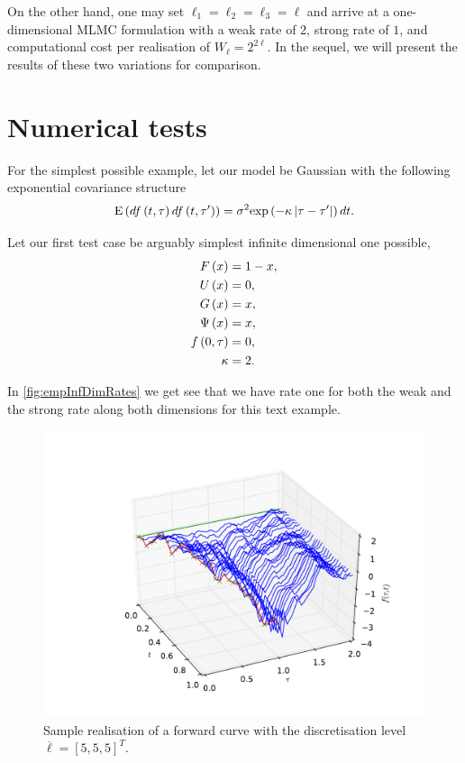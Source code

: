 \documentclass[11pt]{amsart}
\begin{document}
On the other hand, one may set $\ell_1=\ell_2=\ell_3=\ell$
and arrive at a one-dimensional MLMC formulation with a weak rate of $2$, strong rate of $1$, and computational cost per realisation of $W_\ell=2^{2\ell}$. In the sequel, we will present the results of these two variations for comparison.

\section{Numerical tests}

For the simplest possible example, let our model be Gaussian with
the following exponential covariance structure
\begin{align}
\mathrm{E} \left( {{df \left( {t,\tau} \right) df \left( {t, \tau'} \right)}} \right)
=
\sigma^2 \mathrm{exp}\left ( {- \kappa \left| {\tau-\tau'} \right|}\right ) dt.
\end{align}

Let our first test case be arguably simplest infinite dimensional one possible,
\begin{align*}
F \left( {x} \right) &= 1-x,\\
U \left( {x} \right) &= 0, \\
G \left( {x} \right) &= x, \\
\Psi \left( {x} \right) &= x, \\
f \left( {0,\tau} \right) &= 0, \\
\kappa &= 2.
\end{align*}

In \ref{fig:empInfDimRates} we get see that we have rate one for both 
the weak and the strong rate along both dimensions for this text example.

\begin{figure}
\includegraphics[scale=0.7]{figure_1.pdf}
\caption{Sample realisation of a forward curve with the discretisation level 
$\overline \ell = [5,5,5]^T$.}
\end{figure}
\end{document}
